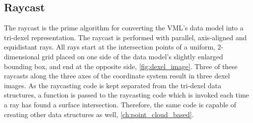 \subsection{Raycast}
\label{sec:tri_dexel_raycast}

The raycast is the prime algorithm for converting the VML's data model into a tri-dexel representation.
The raycast is performed with parallel, axis-aligned and equidistant rays.
All rays start at the intersection points of a uniform, 2-dimensional grid placed on one side of the data model's slightly enlarged bounding box, and end at the opposite side, \cf \cref{fig:dexel_image}.
Three of these raycasts along the three axes of the coordinate system result in three dexel images.
As the raycasting code is kept separated from the tri-dexel data structures, a function is passed to the raycasting code which is invoked each time a ray has found a surface intersection.
Therefore, the same code is capable of creating other data structures as well, \cf \cref{ch:point_cloud_based}.

